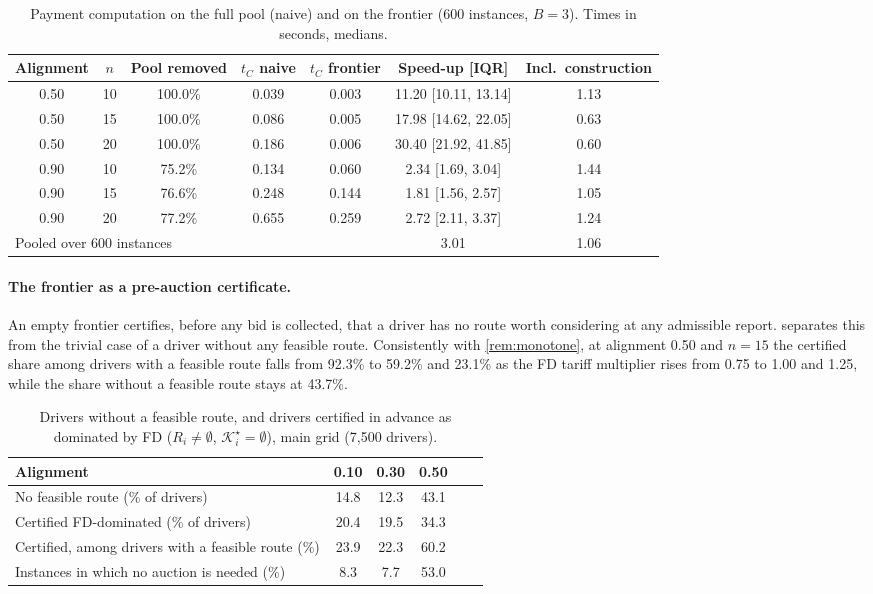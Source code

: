 \documentclass[11pt]{article}
\theoremstyle{definition}
\theoremstyle{remark}
\newcommand{\Ks}{\mathcal{K}^{\star}}
\begin{document}
\begin{table}[!htbp]
\centering
\caption{Payment computation on the full pool (naive) and on the frontier (600 instances, $B=3$). Times in seconds, medians.}
\label{tab:rq4}
\small
\begin{tabular}{ccccccc}
\toprule
Alignment & $n$ & Pool removed & $t_C$ naive & $t_C$ frontier & Speed-up [IQR] & Incl.\ construction\\
\midrule
0.50 & 10 & 100.0\% & 0.039 & 0.003 & 11.20 [10.11, 13.14] & 1.13\\
0.50 & 15 & 100.0\% & 0.086 & 0.005 & 17.98 [14.62, 22.05] & 0.63\\
0.50 & 20 & 100.0\% & 0.186 & 0.006 & 30.40 [21.92, 41.85] & 0.60\\
0.90 & 10 & 75.2\% & 0.134 & 0.060 & 2.34 [1.69, 3.04] & 1.44\\
0.90 & 15 & 76.6\% & 0.248 & 0.144 & 1.81 [1.56, 2.57] & 1.05\\
0.90 & 20 & 77.2\% & 0.655 & 0.259 & 2.72 [2.11, 3.37] & 1.24\\
\midrule
\multicolumn{5}{l}{Pooled over 600 instances} & 3.01 & 1.06\\
\bottomrule
\end{tabular}
\end{table}

\paragraph{The frontier as a pre-auction certificate.} An empty frontier
certifies, before any bid is collected, that a driver has no route worth
considering at any admissible report.  separates this
from the trivial case of a driver without any feasible route. Consistently with
\cref{rem:monotone}, at alignment 0.50 and $n=15$ the certified share among
drivers with a feasible route falls from 92.3\% to 59.2\% and 23.1\% as the FD
tariff multiplier rises from 0.75 to 1.00 and 1.25, while the share without a
feasible route stays at 43.7\%.

\begin{table}[!htbp]
\centering
\caption{Drivers without a feasible route, and drivers certified in advance as dominated by FD ($R_i\ne\emptyset$, $\Ks_i=\emptyset$), main grid (7,500 drivers).}
\label{tab:certificate}
\small
\begin{tabular}{lccccc}
\toprule
Alignment & 0.10 & 0.30 & 0.50\\
\midrule
No feasible route (\% of drivers) & 14.8 & 12.3 & 43.1\\
Certified FD-dominated (\% of drivers) & 20.4 & 19.5 & 34.3\\
Certified, among drivers with a feasible route (\%) & 23.9 & 22.3 & 60.2\\
Instances in which no auction is needed (\%) & 8.3 & 7.7 & 53.0\\
\bottomrule
\end{tabular}
\end{table}
\end{document}
